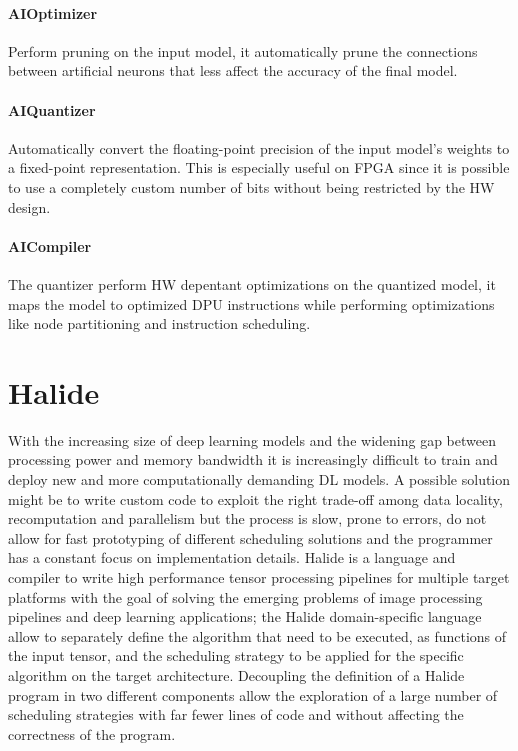 \documentclass[../main.tex]{subfiles}
\begin{document}
\paragraph{AIOptimizer}
Perform pruning on the input model, it automatically prune the connections between artificial neurons that less affect the accuracy of the final model.

\paragraph{AIQuantizer}
Automatically convert the floating-point precision of the input model's weights to a fixed-point representation. This is especially useful on FPGA since it is possible to use a completely custom number of bits without being restricted by the HW design.

\paragraph{AICompiler}
The quantizer perform HW depentant optimizations on the quantized model, it maps the model to optimized DPU instructions while performing optimizations like node partitioning and instruction scheduling.

\section{Halide}
\label {halide}
With the increasing size of deep learning models and the widening gap between processing power and memory bandwidth it is increasingly difficult to train and deploy new and more computationally demanding DL models. A possible solution might be to write custom code to exploit the right trade-off among data locality, recomputation and parallelism but the process is slow, prone to errors, do not allow for fast prototyping of different scheduling solutions and the programmer has a constant focus on implementation details. 
Halide \cite{halide1} is a language and compiler to write high performance tensor processing pipelines for multiple target platforms with the goal of solving the emerging problems of image processing pipelines and deep learning applications; the Halide domain-specific language allow to separately define the algorithm that need to be executed, as functions of the input tensor, and the scheduling strategy to be applied for the specific algorithm on the target architecture. Decoupling the definition of a Halide program in two different components allow the exploration of a large number of scheduling strategies with far fewer lines of code and without affecting the correctness of the program.
\end{document}
